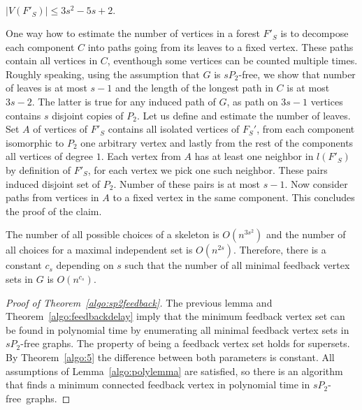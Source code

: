\begin{myproof}
	\begin{claim}
		\(|V(F'_S)| \leq 3s^2 - 5s + 2.\)
	\end{claim}
	One way how to estimate the number of vertices in a forest \(F'_S\) 
	is to decompose each component \(C\) into paths going from its leaves to a fixed vertex. 
	These paths contain all vertices in \(C\), eventhough some vertices can be counted multiple times.
	Roughly speaking, using the assumption that \(G\) is \(sP_2\)-free, we show that number of leaves is at most \(s - 1\) 
	and the length of the longest path in \(C\) is at most \(3s - 2\). 
	The latter is true for any induced path of \(G\), as path on \(3s - 1\) vertices contains \(s\) disjoint copies of \(P_2\).
	Let us define and estimate the number of leaves. 
	Set \(A\) of vertices of \(F'_S\) contains all isolated vertices of \(F_S'\), 
	from each component isomorphic to \(P_2\) one arbitrary vertex and lastly from the rest of the components all vertices of degree \(1\).
	Each vertex from \(A\) has at least one neighbor in \(l(F'_S)\) by definition of \(F'_S\), for each vertex we pick one such neighbor.
	These pairs induced disjoint set of \(P_2\). Number of these pairs is at most \(s - 1\).
	Now consider paths from vertices in \(A\) to a fixed vertex in the same component. 
	This concludes the proof of the claim. 

	The number of all possible choices of a skeleton is \(O(n^{3s^2})\) and the number of all choices for a maximal independent set is \(O(n^{2s})\).
	Therefore, there is a constant \(c_s\) depending on \(s\) such that the number of all minimal feedback vertex sets in \(G\) is \(O(n^{c_s})\).
\end{myproof}

\begin{proof}[Proof of Theorem~\ref{algo:sp2feedback}]
The previous lemma and Theorem~\ref{algo:feedbackdelay} 
imply that the minimum feedback vertex set can be found in polynomial time by enumerating all minimal feedback vertex sets in \(sP_2\)-free graphs.
The property of being a feedback vertex set holds for supersets. 
By Theorem~\ref{algo:5} the difference between both parameters is constant.
All assumptions of Lemma~\ref{algo:polylemma} are satisfied, so there is an algorithm that finds a minimum connected feedback vertex in polynomial time in \(sP_2\)-free~graphs.
\end{proof}

